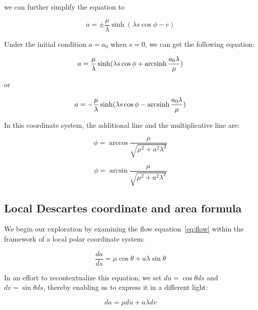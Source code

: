 we can further simplify the equation to

\begin{equation}
  a = \pm \frac{\mu}{\lambda} \sinh(\lambda s \cos \phi - c)\label{eq:gradevo}
\end{equation}

Under the initial condition $a = a_0$ when $s = 0$, we can get the following equation:

\begin{equation}
    a = \frac{\mu}{\lambda} \sinh(\lambda s \cos \phi + \operatorname{arcsinh} \frac{a_0 \lambda}{\mu})\label{eq:gradevo2}
\end{equation}

or

\begin{equation}
    a = - \frac{\mu}{\lambda} \sinh(\lambda s \cos \phi - \operatorname{arcsinh} \frac{a_0 \lambda}{\mu})\label{eq:gradevo3}
\end{equation}

In this coordinate system, the additional line and the multiplicative line are:

\begin{equation}
    \phi = \arccos \frac{\mu}{\sqrt {\mu^2 + a^2 \lambda^2}} \label{eq:additionalline}
\end{equation}

\begin{equation}
    \phi = \arcsin \frac{\mu}{\sqrt {\mu^2 + a^2 \lambda^2}}\label {eq:mulitiplcativeline}
\end{equation}

\subsection{Local Descartes coordinate and area formula}\label{subsec:descartes-coordinate}
We begin our exploration by examining the flow equation~\eqref{eq:flow} within the framework of a local polar coordinate system:

\begin{equation}
    \frac{da}{ds} = \mu \cos \theta + a \lambda \sin \theta
\end{equation}

In an effort to recontextualize this equation, we set $du = \cos \theta ds$ and $dv = \sin \theta ds$,
thereby enabling us to express it in a different light:

\begin{equation}
    da = \mu du + a \lambda dv
\end{equation}

